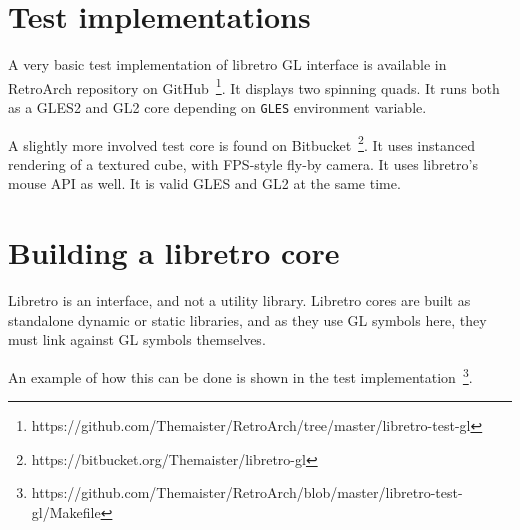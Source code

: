 \documentclass[11pt]{article}
\begin{document}
\section*{Test implementations}
A very basic test implementation of libretro GL interface is available in RetroArch repository on GitHub~\footnote{https://github.com/Themaister/RetroArch/tree/master/libretro-test-gl}.
It displays two spinning quads. It runs both as a GLES2 and GL2 core depending on \texttt{GLES} environment variable.

A slightly more involved test core is found on Bitbucket~\footnote{https://bitbucket.org/Themaister/libretro-gl}. It uses instanced rendering of a textured cube, with FPS-style fly-by camera. It uses libretro's mouse API as well. It is valid GLES and GL2 at the same time.

\section*{Building a libretro core}
Libretro is an interface, and not a utility library. Libretro cores are built as standalone dynamic or static libraries, and as they use GL symbols here, they must link against GL symbols themselves.

An example of how this can be done is shown in the test implementation~\footnote{https://github.com/Themaister/RetroArch/blob/master/libretro-test-gl/Makefile}.
\end{document}
